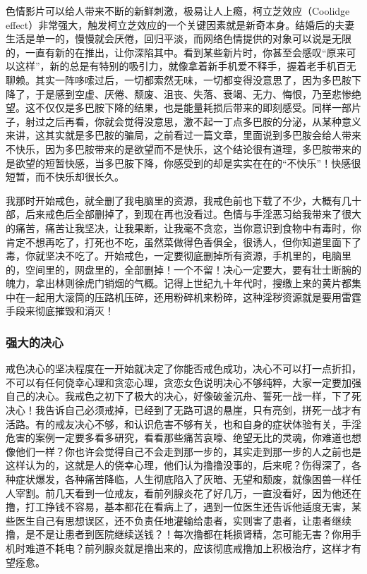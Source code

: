 色情影片可以给人带来不断的新鲜刺激，极易让人上瘾，柯立芝效应（Coolidge effect）非常强大，触发柯立芝效应的一个关键因素就是新奇本身。结婚后的夫妻生活是单一的，慢慢就会厌倦，回归平淡，而网络色情提供的对象可以说是无限的，一直有新的在推出，让你深陷其中。看到某些新片时，你甚至会感叹“原来可以这样”，新的总是有特别的吸引力，就像拿着新手机爱不释手，握着老手机百无聊赖。其实一阵哆嗦过后，一切都索然无味，一切都变得没意思了，因为多巴胺下降了，于是感到空虚、厌倦、颓废、沮丧、失落、衰竭、无力、悔恨，乃至悲惨绝望。这不仅仅是多巴胺下降的结果，也是能量耗损后带来的即刻感受。同样一部片子，射过之后再看，你就会觉得没意思，激不起一丁点多巴胺的分泌，从某种意义来讲，这其实就是多巴胺的骗局，之前看过一篇文章，里面说到多巴胺会给人带来不快乐，因为多巴胺带来的是欲望而不是快乐，这个结论很有道理，多巴胺带来的是欲望的短暂快感，当多巴胺下降，你感受到的却是实实在在的“不快乐”！快感很短暂，而不快乐却很长久。

我那时开始戒色，就全删了我电脑里的资源，我戒色前也下载了不少，大概有几十部，后来戒色后全部删掉了，到现在再也没看过。色情与手淫恶习给我带来了很大的痛苦，痛苦让我坚决，让我果断，让我毫不贪恋，当你意识到食物中有毒时，你肯定不想再吃了，打死也不吃，虽然菜做得色香俱全，很诱人，但你知道里面下了毒，你就坚决不吃了。开始戒色，一定要彻底删掉所有资源，手机里的，电脑里的，空间里的，网盘里的，全部删掉！一个不留！决心一定要大，要有壮士断腕的魄力，拿出林则徐虎门销烟的气概。记得上世纪九十年代时，搜缴上来的黄片都集中在一起用大滚筒的压路机压碎，还用粉碎机来粉碎，这种淫秽资源就是要用雷霆手段来彻底摧毁和消灭！

\subsubsection{强大的决心}

戒色决心的坚决程度在一开始就决定了你能否戒色成功，决心不可以打一点折扣，不可以有任何侥幸心理和贪恋心理，贪恋女色说明决心不够纯粹，大家一定要加强自己的决心。我戒色之初下了极大的决心，好像破釜沉舟、誓死一战一样，下了死决心！我告诉自己必须戒掉，已经到了无路可退的悬崖，只有亮剑，拼死一战才有活路。有的戒友决心不够，和认识危害不够有关，也和自身的症状体验有关，手淫危害的案例一定要多看多研究，看看那些痛苦哀嚎、绝望无比的灵魂，你难道也想像他们一样？你也许会觉得自己不会走到那一步的，其实走到那一步的人之前也是这样认为的，这就是人的侥幸心理，他们认为撸撸没事的，后来呢？伤得深了，各种症状爆发，各种痛苦降临，人生彻底陷入了灰暗、无望和颓废，就像困兽一样任人宰割。前几天看到一位戒友，看前列腺炎花了好几万，一直没看好，因为他还在撸，打工挣钱不容易，基本都花在看病上了，遇到一位医生还告诉他适度无害，某些医生自己有思想误区，还不负责任地灌输给患者，实则害了患者，让患者继续撸，是不是让患者到医院继续送钱？！每次撸都在耗损肾精，怎可能无害？你用手机时难道不耗电？前列腺炎就是撸出来的，应该彻底戒撸加上积极治疗，这样才有望痊愈。

